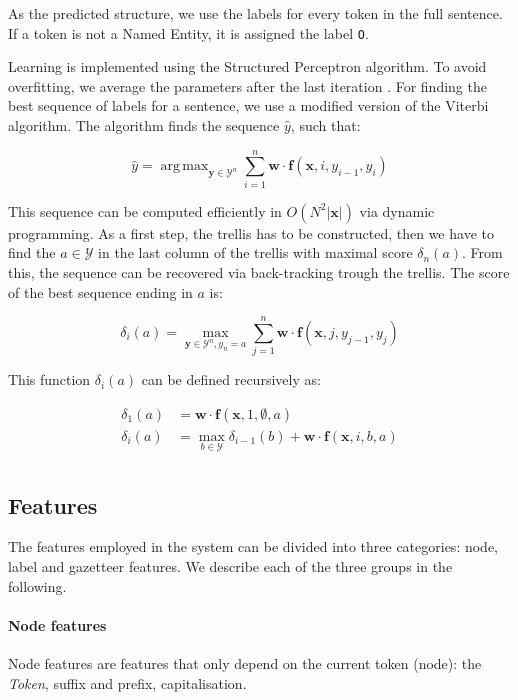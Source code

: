 \documentclass[11pt]{article}
\DeclareMathOperator*{\argmax}{arg\,max}
\newcommand{\namedentity}{Named Entity}
\newcommand{\Oo}{\texttt O}
\begin{document}
As the predicted structure, we use the labels for every token in the full sentence. If a token is not a \namedentity, it is assigned the label \Oo.

Learning is implemented using the Structured Perceptron algorithm. To avoid overfitting, we average the parameters after the last iteration \cite{collins2002discriminative}. For finding the best sequence of labels for a sentence, we use a modified version of the Viterbi algorithm. The algorithm finds the sequence $\hat{y}$, such that:

\[
\hat{y} = \argmax_{\mathbf{y} \in \mathcal{Y}^{n}} \sum_{i=1}^{n}\mathbf{w} \cdot \boldsymbol{f}(\mathbf{x}, i, y_{i-1}, y_{i})
\]

This sequence can be computed efficiently in $ O( N^2 |\mathbf{x}| ) $ via dynamic programming. 
As a first step, the trellis has to be constructed, then we have to find the $ a \in \mathcal{Y}$ in the 
last column of the trellis with maximal score $\delta_n(a)$. From this, the sequence can be recovered via back-tracking trough the trellis. 
The score of the best sequence ending in $a$ is:

\[
\delta_i(a) = \max_{\mathbf{y} \in \mathcal{Y}^{n}, y_n = a} \sum_{j=1}^{n}{\mathbf{w} \cdot \boldsymbol{f}(\mathbf{x}, j, y_{j-1}, y_{j})}
\]

\noindent This function $\delta_i(a)$ can be defined recursively as:

\begin{align*}
\delta_1(a) &= \mathbf{w} \cdot \boldsymbol{f}(\mathbf{x}, 1, \emptyset, a) \\
\delta_i(a) &= \max_{b \in \mathcal{Y}} \delta_{i-1}(b) + \mathbf{w} \cdot \boldsymbol{f}(\mathbf{x}, i, b, a) \\
\end{align*}


\subsection{Features}
The features employed in the system can be divided into three categories: node, label and gazetteer features. 
We describe each of the three groups in the following.

\paragraph*{Node features}
Node features are features that only depend on the current token (node): the \emph{Token}, suffix and prefix, capitalisation.
\end{document}
